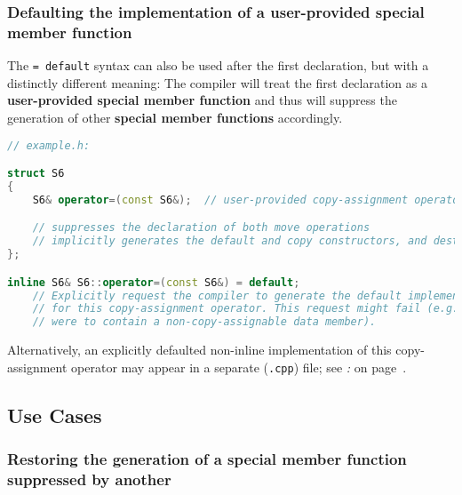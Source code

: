\subsubsection[Defaulting the implementation of a user-provided special member function]{Defaulting the implementation of a user-provided special member function}\label{defaulting-the-implementation-of-a-user-provided-special-member-function}

The \texttt{=}~\texttt{default} syntax can also be used after the first
declaration, but with a distinctly different meaning: The compiler will
treat the first declaration as a \textbf{user-provided special member
function} and thus will suppress the generation of other
\textbf{special member functions} accordingly.

\begin{lstlisting}[language=C++,label=default-exampleh-code]
// example.h:

struct S6
{
    S6& operator=(const S6&);  // user-provided copy-assignment operator

    // suppresses the declaration of both move operations
    // implicitly generates the default and copy constructors, and destructor
};

inline S6& S6::operator=(const S6&) = default;
    // Explicitly request the compiler to generate the default implementation
    // for this copy-assignment operator. This request might fail (e.g., if (ù{\codeincomments{S6}}ù)
    // were to contain a non-copy-assignable data member).
\end{lstlisting}

\noindent Alternatively, an explicitly defaulted non-inline implementation of this
copy-assignment operator may appear in a separate (\texttt{.cpp}) file;
see {\it{}: } on page~\pageref{physically-decoupling-the-interface-from-the-implementation}.

\subsection[Use Cases]{Use Cases}\label{default-use-cases}

\subsubsection[Restoring the generation of a special member function suppressed by another]{Restoring the generation of a special member function suppressed by another}\label{restoring-the-generation-of-a-special-member-function-suppressed-by-another}

